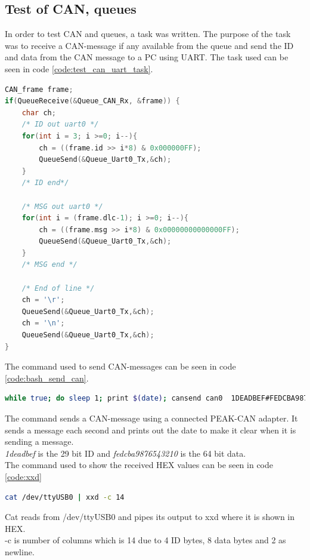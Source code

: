 \subsection{Test of CAN, queues}
In order to test CAN and queues, a task was written. The purpose of the task was to receive a CAN-message if any available from the queue and send the ID and data from the CAN message to a PC using UART.
The task used can be seen in code \ref{code:test_can_uart_task}.


\begin{lstlisting}[language = c, caption = Task used to test CAN, label=code:test_can_uart_task]
CAN_frame frame;
if(QueueReceive(&Queue_CAN_Rx, &frame)) {
	char ch;
	/* ID out uart0 */
	for(int i = 3; i >=0; i--){
		ch = ((frame.id >> i*8) & 0x000000FF);
		QueueSend(&Queue_Uart0_Tx,&ch);
	}
	/* ID end*/

	/* MSG out uart0 */
	for(int i = (frame.dlc-1); i >=0; i--){
		ch = ((frame.msg >> i*8) & 0x00000000000000FF);
		QueueSend(&Queue_Uart0_Tx,&ch);
	}
	/* MSG end */

	/* End of line */
	ch = '\r';
	QueueSend(&Queue_Uart0_Tx,&ch);
	ch = '\n';
	QueueSend(&Queue_Uart0_Tx,&ch);
}
\end{lstlisting}
The command used to send CAN-messages can be seen in code \ref{code:bash_send_can}.

\begin{lstlisting}[language = bash, caption = Task used to test CAN, label=code:bash_send_can]
while true; do sleep 1; print $(date); cansend can0  1DEADBEF#FEDCBA9876543210; done
\end{lstlisting}
The command sends a CAN-message using a connected PEAK-CAN adapter. It sends a message each second and prints out the date to make it clear when it is sending a message.\\ \textit{1deadbef} is the 29 bit ID and \textit{fedcba9876543210} is the 64 bit data. \\


The command used to show the received HEX values can be seen in code \ref{code:xxd}

\begin{lstlisting}[language = bash, caption = Command used to get UART messages, label=code:xxd]
cat /dev/ttyUSB0 | xxd -c 14 
\end{lstlisting}
Cat reads from /dev/ttyUSB0 and pipes its output to xxd where it is shown in HEX.\\ -c is number of columns which is 14 due to 4 ID bytes, 8 data bytes and 2 as newline.\\

